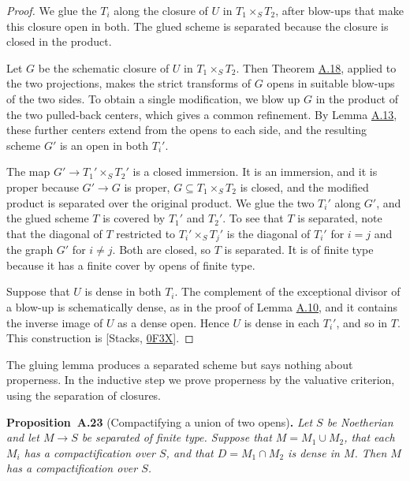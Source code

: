 \documentclass[11pt]{article}
\newenvironment{bpstatement}[2]{\par\addvspace{0.6\baselineskip}\noindent\textbf{#1}#2\textbf{.}\enspace\ignorespaces}
  {\par\addvspace{0.4\baselineskip}}
\newenvironment{bpstatementit}[2]{\begin{bpstatement}{#1}{#2}\itshape\ignorespaces}{\end{bpstatement}}
\begin{document}
\begin{proof}[{Proof}]\label{bp59}%
We glue the \(T_i\) along the closure of \(U\) in \(T_1\times_ST_2\), after blow-ups that make this closure open in both. The glued scheme is separated because the closure is closed in the product.

Let \(G\) be the schematic closure of \(U\) in \(T_1\times_ST_2\). Then Theorem \hyperref[bp46]{A.18}, applied to the two projections, makes the strict transforms of \(G\) opens in suitable blow-ups of the two sides. To obtain a single modification, we blow up \(G\) in the product of the two pulled-back centers, which gives a common refinement. By Lemma \hyperref[bp33]{A.13}, these further centers extend from the opens to each side, and the resulting scheme \(G'\) is an open in both \(T_i'\).

The map \(G'\to T_1'\times_ST_2'\) is a closed immersion. It is an immersion, and it is proper because \(G'\to G\) is proper, \(G\subseteq T_1\times_ST_2\) is closed, and the modified product is separated over the original product. We glue the two \(T_i'\) along \(G'\), and the glued scheme \(T\) is covered by \(T_1'\) and \(T_2'\). To see that \(T\) is separated, note that the diagonal of \(T\) restricted to \(T_i'\times_ST_j'\) is the diagonal of \(T_i'\) for \(i=j\) and the graph \(G'\) for \(i\neq j\). Both are closed, so \(T\) is separated. It is of finite type because it has a finite cover by opens of finite type.

Suppose that \(U\) is dense in both \(T_i\). The complement of the exceptional divisor of a blow-up is schematically dense, as in the proof of Lemma \hyperref[bp27]{A.10}, and it contains the inverse image of \(U\) as a dense open. Hence \(U\) is dense in each \(T_i'\), and so in \(T\). This construction is [Stacks, \href{https://stacks.math.columbia.edu/tag/0F3X}{0F3X}].
\end{proof}

\label{bp60}%
The gluing lemma produces a separated scheme but says nothing about properness. In the inductive step we prove properness by the valuative criterion, using the separation of closures.

\label{bp61}%
\begin{bpstatementit}{Proposition~A.23}{ (Compactifying a union of two opens)}
Let \(S\) be Noetherian and let \(M\to S\) be separated of finite type. Suppose that \(M=M_1\cup M_2\), that each \(M_i\) has a compactification over \(S\), and that \(D=M_1\cap M_2\) is dense in \(M\). Then \(M\) has a compactification over \(S\).
\end{bpstatementit}
\end{document}
